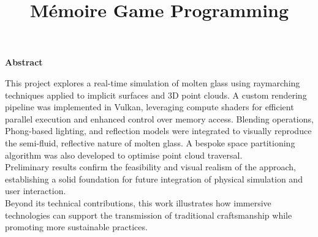 \documentclass{rapportcs}
\title{Mémoire Game Programming}
\begin{document}









\fairemarges %
\fairepagedegarde %


\begin{center}
\textbf{Abstract}
\end{center}

\vspace{1em} %

    This project explores a real-time simulation of molten glass using raymarching techniques applied to implicit surfaces and 3D point clouds. A custom rendering pipeline was implemented in Vulkan, leveraging compute shaders for efficient parallel execution and enhanced control over memory access. Blending operations, Phong-based lighting, and reflection models were integrated to visually reproduce the semi-fluid, reflective nature of molten glass. A bespoke space partitioning algorithm was also developed to optimise point cloud traversal. \\
    Preliminary results confirm the feasibility and visual realism of the approach, establishing a solid foundation for future integration of physical simulation and user interaction. \\
    Beyond its technical contributions, this work illustrates how immersive technologies can support the transmission of traditional craftsmanship while promoting more sustainable practices.
\end{document}
